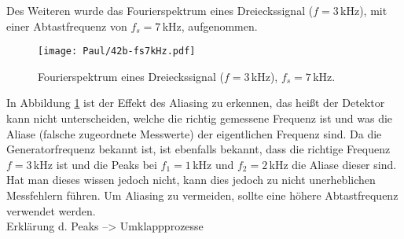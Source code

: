 \newpage
Des Weiteren wurde das Fourierspektrum eines Dreieckssignal ($f = 3$\,kHz), mit einer Abtastfrequenz von $f_s = 7$\,kHz, aufgenommen.
\begin{figure}[h]
    \centering
    \texttt{[image: Paul/42b-fs7kHz.pdf]}
    \caption{Fourierspektrum eines Dreieckssignal ($f = 3$\,kHz), $f_s = 7$\,kHz.}
    \label{fig:42a3}
\end{figure}

In Abbildung \ref{fig:42a3} ist der Effekt des Aliasing zu erkennen, das heißt der Detektor kann nicht unterscheiden, welche die richtig gemessene Frequenz ist und was die Aliase (falsche zugeordnete Messwerte) der eigentlichen Frequenz sind. Da die Generatorfrequenz bekannt ist, ist ebenfalls bekannt, dass die richtige Frequenz $f=3$\,kHz ist und die Peaks bei $f_1=1$\,kHz und $f_2=2$\,kHz die Aliase dieser sind. Hat man dieses wissen jedoch nicht, kann dies jedoch zu nicht unerheblichen Messfehlern führen. Um Aliasing zu vermeiden, sollte eine höhere Abtastfrequenz verwendet werden.\\

Erklärung d. Peaks --> Umklappprozesse